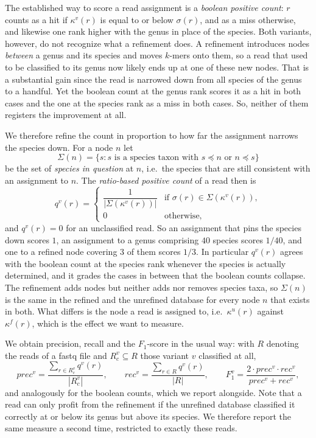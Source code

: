 \documentclass[pdflatex,sn-vancouver-num]{sn-jnl}
\begin{document}
    The established way to score a read assignment is a \emph{boolean positive count}: $r$ counts as a hit if $\kappa^v(r)$ is equal to or below $\sigma(r)$, and as a miss otherwise, and likewise one rank higher with the genus in place of the species. Both variants, however, do not recognize what a refinement does. A refinement introduces nodes \emph{between} a genus and its species and moves $k$-mers onto them, so a read that used to be classified to its genus now likely ends up at one of these new nodes. That is a substantial gain since the read is narrowed down from all species of the genus to a handful. Yet the boolean count at the genus rank scores it as a hit in both cases and the one at the species rank as a miss in both cases. So, neither of them registers the improvement at all.

    We therefore refine the count in proportion to how far the assignment narrows the species down. For a node $n$ let
\[ \Sigma(n) = \{ s : s \text{ is a species taxon with } s \preceq n \text{ or } n \preceq s \} \]
    be the set of \emph{species in question} at $n$, i.e.\ the species that are still consistent with an assignment to $n$. The \emph{ratio-based positive count} of a read then is
\[ q^v(r) = \begin{cases} \dfrac{1}{|\Sigma(\kappa^v(r))|} & \text{if } \sigma(r) \in \Sigma(\kappa^v(r)), \\[2ex] 0 & \text{otherwise,} \end{cases} \]
    and $q^v(r) = 0$ for an unclassified read. So an assignment that pins the species down scores $1$, an assignment to a genus comprising $40$ species scores $1/40$, and one to a refined node covering $3$ of them scores $1/3$. In particular $q^v(r)$ agrees with the boolean count at the species rank whenever the species is actually determined, and it grades the cases in between that the boolean counts collapse. The refinement adds nodes but neither adds nor removes species taxa, so $\Sigma(n)$ is the same in the refined and the unrefined database for every node $n$ that exists in both. What differs is the node a read is assigned to, i.e.\ $\kappa^u(r)$ against $\kappa^f(r)$, which is the effect we want to measure.

    We obtain precision, recall and the $F_1$-score in the usual way: with $R$ denoting the reads of a fastq file and $R^v_c \subseteq R$ those variant $v$ classified at all,
\[ \mathit{prec}^v = \frac{\sum_{r \in R^v_c} q^v(r)}{|R^v_c|}, \qquad \mathit{rec}^v = \frac{\sum_{r \in R} q^v(r)}{|R|}, \qquad F_1^v = \frac{2 \cdot \mathit{prec}^v \cdot \mathit{rec}^v}{\mathit{prec}^v + \mathit{rec}^v} , \]
    and analogously for the boolean counts, which we report alongside. Note that a read can only profit from the refinement if the unrefined database classified it correctly at or below its genus but above its species. We therefore report the same measure a second time, restricted to exactly these reads.
\end{document}
